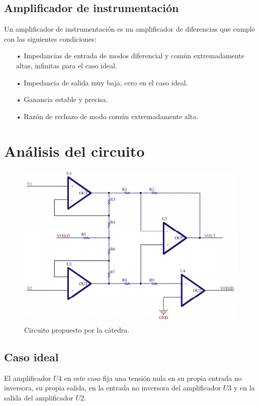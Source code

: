 \documentclass[11pt, a4paper]{article}
\begin{document}
\subsection{Amplificador de instrumentación}
Un amplificador de instrumentación es un amplificador de diferencias que cumple con las siguientes condiciones:
\begin{itemize}
\item[•] Impedancias de entrada de modos diferencial y común extremadamente altas, infinitas para el caso ideal.
\item[•] Impedancia de salida muy baja, cero en el caso ideal.
\item[•] Ganancia estable y precisa.
\item[•] Razón de rechazo de modo común extremadamente alta.
\end{itemize}

\section{Análisis del circuito}
\begin{figure}[H]
\centering
\includegraphics[scale=0.7]{circcatedra.png}
\caption{Circuito propuesto por la cátedra.}
\label{fig:circcatedra}
\end{figure}

\subsection{Caso ideal}
	El amplificador $\mathit{U4}$ en este caso fija una tensión nula en su propia entrada no inversora, su propia salida, en la entrada no inversora del amplificador $\mathit{U3}$ y en la salida del amplificador $\mathit{U2}$.
\end{document}
